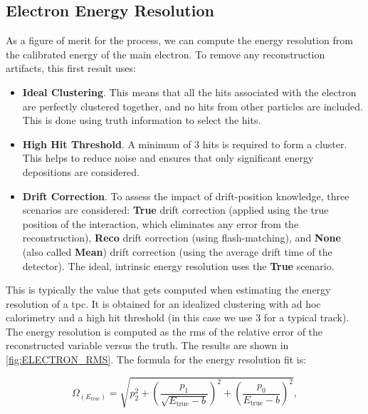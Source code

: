 \subsection{Electron Energy Resolution}\label{sec:ELECTRON_ENERGY_RESOLUTION}
As a figure of merit for the process, we can compute the energy resolution from the calibrated energy of the main electron. To remove any reconstruction artifacts, this first result uses: 

\begin{itemize}
    \item \textbf{Ideal Clustering}. This means that all the hits associated with the electron are perfectly clustered together, and no hits from other particles are included. This is done using truth information to select the hits.
    \item \textbf{High Hit Threshold}. A minimum of 3 hits is required to form a cluster. This helps to reduce noise and ensures that only significant energy depositions are considered.
    \item \textbf{Drift Correction}. To assess the impact of drift-position knowledge, three scenarios are considered: \textbf{True} drift correction (applied using the true position of the interaction, which eliminates any error from the reconstruction), \textbf{Reco} drift correction (using flash-matching), and \textbf{None} (also called \textbf{Mean}) drift correction (using the average drift time of the detector). The ideal, intrinsic energy resolution uses the \textbf{True} scenario.
\end{itemize}

This is typically the value that gets computed when estimating the energy resolution of a \gls{tpc}. It is obtained for an idealized clustering with ad hoc calorimetry and a high hit threshold (in this case we use 3 for a typical track). The energy resolution is computed as the \gls{rms} of the relative error of the reconstructed variable versus the truth. The results are shown in \cref{fig:ELECTRON_RMS}. The formula for the energy resolution fit is:

\begin{equation}
    \Omega_{(E_\text{true})} = \sqrt{p_2^2 + \left(\frac{p_1}{\sqrt{E_{\text{true}} - b}}\right)^2 + \left(\frac{p_0}{E_{\text{true}} - b}\right)^2},
\end{equation}

